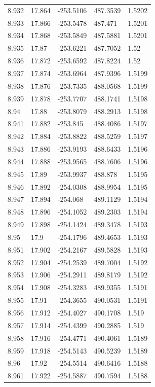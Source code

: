 \begin{tabular}{lllll}
8.932 & 17.864 & -253.5106 & 487.3539 & 1.5202 \\
8.933 & 17.866 & -253.5478 & 487.471 & 1.5201 \\
8.934 & 17.868 & -253.5849 & 487.5881 & 1.5201 \\
8.935 & 17.87 & -253.6221 & 487.7052 & 1.52 \\
8.936 & 17.872 & -253.6592 & 487.8224 & 1.52 \\
8.937 & 17.874 & -253.6964 & 487.9396 & 1.5199 \\
8.938 & 17.876 & -253.7335 & 488.0568 & 1.5199 \\
8.939 & 17.878 & -253.7707 & 488.1741 & 1.5198 \\
8.94 & 17.88 & -253.8079 & 488.2913 & 1.5198 \\
8.941 & 17.882 & -253.845 & 488.4086 & 1.5197 \\
8.942 & 17.884 & -253.8822 & 488.5259 & 1.5197 \\
8.943 & 17.886 & -253.9193 & 488.6433 & 1.5196 \\
8.944 & 17.888 & -253.9565 & 488.7606 & 1.5196 \\
8.945 & 17.89 & -253.9937 & 488.878 & 1.5195 \\
8.946 & 17.892 & -254.0308 & 488.9954 & 1.5195 \\
8.947 & 17.894 & -254.068 & 489.1129 & 1.5194 \\
8.948 & 17.896 & -254.1052 & 489.2303 & 1.5194 \\
8.949 & 17.898 & -254.1424 & 489.3478 & 1.5193 \\
8.95 & 17.9 & -254.1796 & 489.4653 & 1.5193 \\
8.951 & 17.902 & -254.2167 & 489.5828 & 1.5193 \\
8.952 & 17.904 & -254.2539 & 489.7004 & 1.5192 \\
8.953 & 17.906 & -254.2911 & 489.8179 & 1.5192 \\
8.954 & 17.908 & -254.3283 & 489.9355 & 1.5191 \\
8.955 & 17.91 & -254.3655 & 490.0531 & 1.5191 \\
8.956 & 17.912 & -254.4027 & 490.1708 & 1.519 \\
8.957 & 17.914 & -254.4399 & 490.2885 & 1.519 \\
8.958 & 17.916 & -254.4771 & 490.4061 & 1.5189 \\
8.959 & 17.918 & -254.5143 & 490.5239 & 1.5189 \\
8.96 & 17.92 & -254.5514 & 490.6416 & 1.5188 \\
8.961 & 17.922 & -254.5887 & 490.7594 & 1.5188 \\

\end{tabular}
